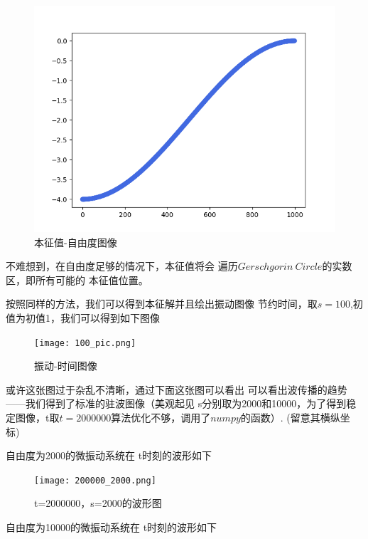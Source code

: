 \documentclass[11pt, a4paper, oneside]{ctexart}
\begin{document}
{{{\begin{figure}[H]
    \centering
    \vspace{2mm}
    \includegraphics[scale=0.45]{v-1000.png}
    \caption{本征值-自由度图像 }
\end{figure} 
不难想到，在自由度足够的情况下，本征值将会
遍历$Gerschgorin\ Circle$的实数区，即所有可能的
本征值位置。

按照同样的方法，我们可以得到本征解并且绘出振动图像
节约时间，取$s=100$,初值为初值1，我们可以得到如下图像
\begin{figure}[H]
        
    \centering
    \vspace{2mm}
    \texttt{[image: 100\_pic.png]}
    \caption{振动-时间图像 }
\end{figure} 

或许这张图过于杂乱不清晰，通过下面这张图可以看出
可以看出波传播的趋势——我们得到了标准的驻波图像（美观起见
s分别取为2000和10000，为了得到稳定图像，t取$t= 2000000$算法优化不够，调用了$numpy$的函数）.
(留意其横纵坐标)

\newpage

自由度为2000的微振动系统在
t时刻的波形如下

\begin{figure}[H]
        
    \centering
    \vspace{2mm}
    \texttt{[image: 200000\_2000.png]}
    \caption{t=2000000，s=2000的波形图 }
\end{figure} 


\vspace{7mm}
自由度为10000的微振动系统在
t时刻的波形如下

}}}
\end{document}
